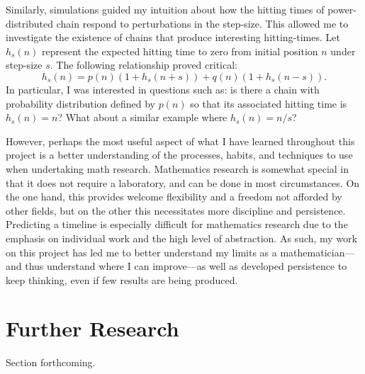 \documentclass[12pt,letterpaper]{article}
\begin{document}
Similarly, simulations guided my intuition about how the hitting times of power-distributed chain
respond to perturbations in the step-size. This allowed me to investigate the existence of chains that
produce interesting hitting-times. Let $h_s(n)$ represent the expected hitting time to zero from initial
position $n$ under step-size $s$. The following relationship proved critical:
\[
    h_s(n) = p(n)(1+h_s(n+s)) + q(n)(1+h_s(n-s)).
\]
In particular, I was interested in questions such as: is there a chain with probability distribution
defined by $p(n)$ so that its associated hitting time is $h_s(n) = n$? What about a similar example
where $h_s(n) = n/s$?

However, perhaps the most useful aspect of what I have learned throughout this project is a better
understanding of the processes, habits, and techniques to use when undertaking math research.
Mathematics research is somewhat special in that it does not require a laboratory, and can be done in
most circumstances. On the one hand, this provides welcome flexibility and a freedom not afforded by
other fields, but on the other this necessitates more discipline and persistence. Predicting a timeline
is especially difficult for mathematics research due to the emphasis on individual work and the high
level of abstraction. As such, my work on this project has led me to better understand my limits as a
mathematician---and thus understand where I can improve---as well as developed persistence to keep
thinking, even if few results are being produced.

\section*{Further Research}
Section forthcoming.
\end{document}
